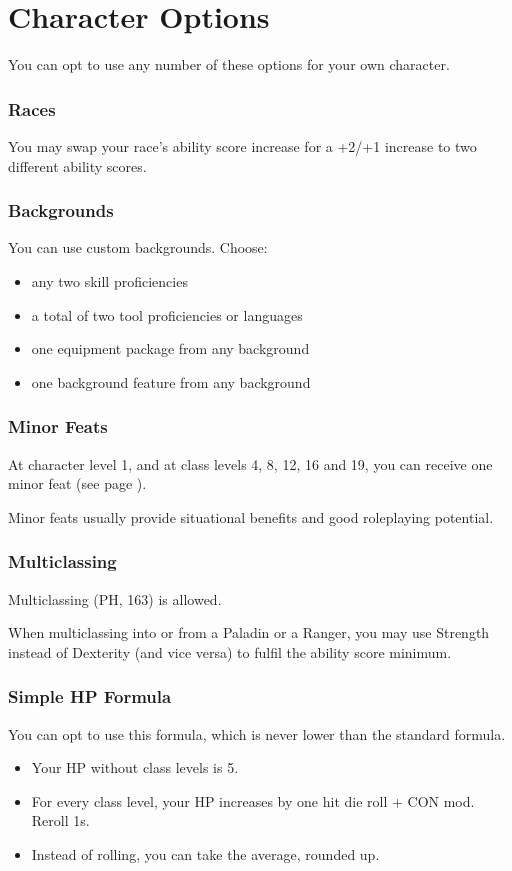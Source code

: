 \documentclass[letterpaper,twocolumn,openany,nodeprecatedcode,bg=print]{dndbook}
\newcommand{\pg}[1]{page \pageref{#1}}
\newcommand{\see}[1]{(see \pg{#1})}
\begin{document}
\chapter{Character Options}
\noindent You can opt to use any number of these options for your own character.

\subsection{Races}
You may swap your race's ability score increase for a +2/+1 increase to two different ability scores.

\subsection{Backgrounds}
You can use custom backgrounds. Choose:
\begin{itemize}
\item any two skill proficiencies 
\item a total of two tool proficiencies or languages 
\item one equipment package from any background
\item one background feature from any background
\end{itemize}

\subsection{Minor Feats}
\label{minor-feats}
At character level 1, and at class levels 4, 8, 12, 16 and 19, 
you can receive one minor feat \see{minor-feats-table}.

Minor feats usually provide situational benefits and good roleplaying potential.

\subsection{Multiclassing}
Multiclassing (PH, 163) is allowed. 

When multiclassing into or from a Paladin or a Ranger, 
you may use Strength instead of Dexterity (and vice versa) to fulfil the ability score minimum. 

\subsection{Simple HP Formula}
You can opt to use this formula, which is never lower than the standard formula.
\begin{itemize}
\item Your HP without class levels is 5.
\item For every class level, your HP increases by one hit die roll + CON mod. Reroll 1s. 
\item Instead of rolling, you can take the average, rounded up.
\end{itemize}
\end{document}
